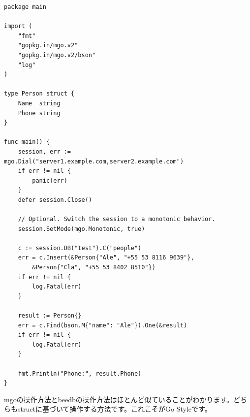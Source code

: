 \begin{lstlisting}[numbers=none]
package main

import (
    "fmt"
    "gopkg.in/mgo.v2"
    "gopkg.in/mgo.v2/bson"
    "log"
)

type Person struct {
    Name  string
    Phone string
}

func main() {
    session, err := mgo.Dial("server1.example.com,server2.example.com")
    if err != nil {
        panic(err)
    }
    defer session.Close()

    // Optional. Switch the session to a monotonic behavior.
    session.SetMode(mgo.Monotonic, true)

    c := session.DB("test").C("people")
    err = c.Insert(&Person{"Ale", "+55 53 8116 9639"},
        &Person{"Cla", "+55 53 8402 8510"})
    if err != nil {
        log.Fatal(err)
    }

    result := Person{}
    err = c.Find(bson.M{"name": "Ale"}).One(&result)
    if err != nil {
        log.Fatal(err)
    }

    fmt.Println("Phone:", result.Phone)
}
\end{lstlisting}

mgoの操作方法とbeedbの操作方法はほとんど似ていることがわかります。どちらもstructに基づいて操作する方法です。これこそがGo Styleです。
